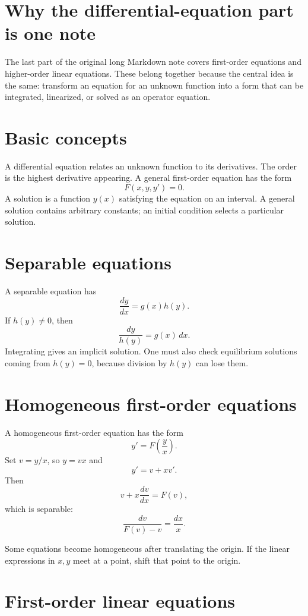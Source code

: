 
\section{Why the differential-equation part is one note}

The last part of the original long Markdown note covers first-order equations and higher-order linear equations.  These belong together because the central idea is the same: transform an equation for an unknown function into a form that can be integrated, linearized, or solved as an operator equation.

\section{Basic concepts}

A differential equation relates an unknown function to its derivatives.  The order is the highest derivative appearing.  A general first-order equation has the form
\[
  F(x,y,y')=0.
\]
A solution is a function $y(x)$ satisfying the equation on an interval.  A general solution contains arbitrary constants; an initial condition selects a particular solution.

\section{Separable equations}

A separable equation has
\[
  \frac{dy}{dx}=g(x)h(y).
\]
If $h(y)\ne0$, then
\[
  \frac{dy}{h(y)}=g(x)\,dx.
\]
Integrating gives an implicit solution.  One must also check equilibrium solutions coming from $h(y)=0$, because division by $h(y)$ can lose them.

\section{Homogeneous first-order equations}

A homogeneous first-order equation has the form
\[
  y'=F\left(\frac yx\right).
\]
Set $v=y/x$, so $y=vx$ and
\[
  y'=v+xv'.
\]
Then
\[
  v+x\frac{dv}{dx}=F(v),
\]
which is separable:
\[
  \frac{dv}{F(v)-v}=\frac{dx}{x}.
\]

Some equations become homogeneous after translating the origin.  If the linear expressions in $x,y$ meet at a point, shift that point to the origin.

\section{First-order linear equations}

